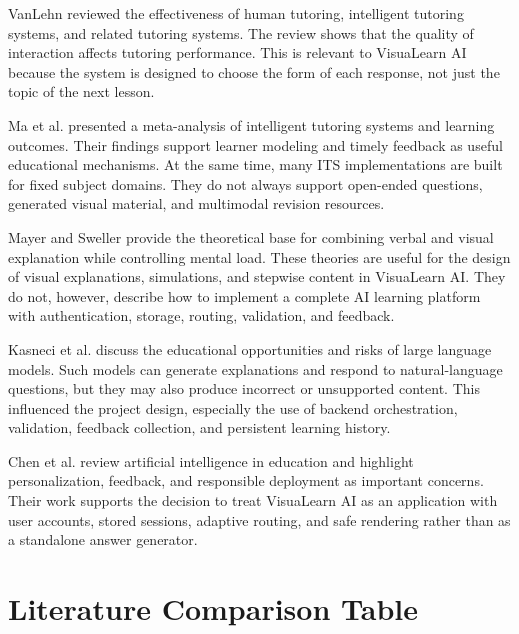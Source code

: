 VanLehn \cite{VanLehn2011} reviewed the effectiveness of human tutoring, intelligent tutoring systems, and related tutoring systems. The review shows that the quality of interaction affects tutoring performance. This is relevant to VisuaLearn AI because the system is designed to choose the form of each response, not just the topic of the next lesson.

Ma et al. \cite{Ma2014} presented a meta-analysis of intelligent tutoring systems and learning outcomes. Their findings support learner modeling and timely feedback as useful educational mechanisms. At the same time, many ITS implementations are built for fixed subject domains. They do not always support open-ended questions, generated visual material, and multimodal revision resources.

Mayer \cite{Mayer2009} and Sweller \cite{Sweller1988} provide the theoretical base for combining verbal and visual explanation while controlling mental load. These theories are useful for the design of visual explanations, simulations, and stepwise content in VisuaLearn AI. They do not, however, describe how to implement a complete AI learning platform with authentication, storage, routing, validation, and feedback.

Kasneci et al. \cite{Kasneci2023} discuss the educational opportunities and risks of large language models. Such models can generate explanations and respond to natural-language questions, but they may also produce incorrect or unsupported content. This influenced the project design, especially the use of backend orchestration, validation, feedback collection, and persistent learning history.

Chen et al. \cite{Chen2020} review artificial intelligence in education and highlight personalization, feedback, and responsible deployment as important concerns. Their work supports the decision to treat VisuaLearn AI as an application with user accounts, stored sessions, adaptive routing, and safe rendering rather than as a standalone answer generator.

\section[Literature Comparison Table]{\textbf{Literature Comparison Table}}

